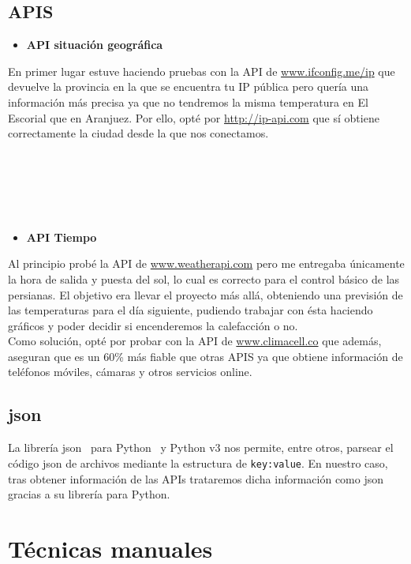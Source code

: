 \subsection{APIS}\label{4:APIS}
\begin{itemize}
    \item \textbf{API situación geográfica}
\end{itemize}
En primer lugar estuve haciendo pruebas con la API de \url{www.ifconfig.me/ip} que devuelve la provincia en la que se encuentra tu IP pública pero quería una información más precisa ya que no tendremos la misma temperatura en El Escorial que en Aranjuez. Por ello, opté por \url{http://ip-api.com} que sí obtiene correctamente la ciudad desde la que nos conectamos.
~\\~\\~\\~\\~\\~\\
\begin{itemize}
    \item \textbf{API Tiempo}\label{4:API_Tiempo}
\end{itemize}
Al principio probé la API de \url{www.weatherapi.com} pero me entregaba únicamente la hora de salida y puesta del sol, lo cual es correcto para el control básico de las persianas. El objetivo era llevar el proyecto más allá, obteniendo una previsión de las temperaturas para el día siguiente, pudiendo trabajar con ésta haciendo gráficos y poder decidir si encenderemos la calefacción o no.\\
Como solución, opté por probar con la API de \url{www.climacell.co} que además, aseguran que es un 60\% más fiable que otras APIS ya que obtiene información de teléfonos móviles, cámaras y otros servicios online.

\subsection{json}\label{4:JSON}
La librería json~\cite{misc:Json} para Python~\cite{misc:Python} y Python v3 nos permite, entre otros, parsear el código json de archivos mediante la estructura de \texttt{key:value}. En nuestro caso, tras obtener información de las APIs trataremos dicha información como json gracias a su librería para Python.

\section{Técnicas manuales}

